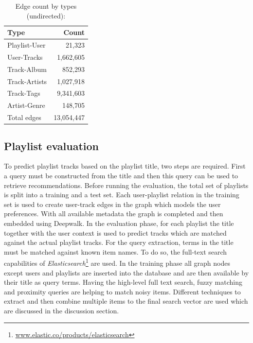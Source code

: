 \documentclass[sigconf]{acmart}
\begin{document}
\begin{table}[H]
	\caption{Edge count by types (undirected):}
	\label{table:edge_count}
	\begin{tabular}{lr}
		\midrule 
		\textbf{Type} & \textbf{Count} \\ 
		\midrule 
		Playlist-User   & 21,323  \\
		User-Tracks     & 1,662,605     \\
		Track-Album		& 852,293 \\
		Track-Artists   & 1,027,918 \\
		Track-Tags   	& 9,341,603 \\
		Artist-Genre	& 148,705  \\
		\midrule 
		Total edges 	& 13,054,447\\
		\bottomrule
	\end{tabular}
\end{table}

\subsection{Playlist evaluation}
\label{subsec:playlist_eval}
To predict playlist tracks based on the playlist title, two steps are required. First a query must be constructed from the title and then this query can be used to retrieve recommendations. Before running the evaluation, the total set of playlists is split into a training and a test set. Each user-playlist relation in the training set is used to create user-track edges in the graph which models the user preferences. With all available metadata the graph is completed and then embedded using Deepwalk. In the evaluation phase, for each playlist the title together with the user context is used to predict tracks which are matched against the actual playlist tracks. For the query extraction, terms in the title must be matched against known item names. To do so, the full-text search capabilities of \emph{Elasticsearch}\footnote{\url{www.elastic.co/products/elasticsearch}} are used. In the training phase all graph nodes except users and playlists are inserted into the database and are then available by their title as query terms. Having the high-level full text search, fuzzy matching and proximity queries are helping to match noisy items. Different techniques to extract and then combine multiple items to the final search vector are used which are discussed in the discussion section.

\end{document}
